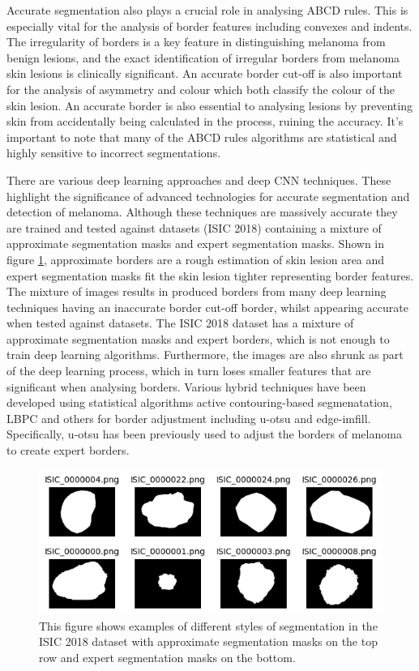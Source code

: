 Accurate segmentation also plays a crucial role in analysing ABCD rules\cite{Lee2020}. This is especially vital for the analysis of border features\cite{Pereira2020, Kaya2016} including convexes and indents. The irregularity of borders is a key feature in distinguishing melanoma from benign lesions, and the exact identification of irregular borders from melanoma skin lesions is clinically significant\cite{patil2021}. An accurate border cut-off is also important for the analysis of asymmetry and colour which both classify the colour of the skin lesion. An accurate border is also essential to analysing lesions by preventing skin from accidentally being calculated in the process, ruining the accuracy. It's important to note that many of the ABCD rules algorithms are statistical and highly sensitive to incorrect segmentations.

There are various deep learning approaches\cite{Albahli2020} and deep CNN techniques\cite{yu2017}. These highlight the significance of advanced technologies for accurate segmentation and detection of melanoma. Although these techniques are massively accurate they are trained and tested against datasets (ISIC 2018) containing a mixture of approximate segmentation masks and expert segmentation masks. Shown in figure \ref{seg-expert}, approximate borders are a rough estimation of skin lesion area and expert segmentation masks fit the skin lesion tighter representing border features. The mixture of images results in produced borders from many deep learning techniques having an inaccurate border cut-off border, whilst appearing accurate when tested against datasets. The ISIC 2018 dataset has a mixture of approximate segmentation masks and expert borders, which is not enough to train deep learning algorithms. Furthermore, the images are also shrunk as part of the deep learning process, which in turn loses smaller features that are significant when analysing borders. Various hybrid techniques have been developed using statistical algorithms active contouring-based segmenatation\cite{Riaz2019}, LBPC and others for border adjustment including u-otsu and edge-imfill. Specifically, u-otsu has been previously used to adjust the borders of melanoma to create expert borders\cite{}.

\begin{figure}[]
    \centering
    \includegraphics[scale=0.9]{images/segmentation/seg-expert-approx.png}
    \caption{This figure shows examples of different styles of segmentation in the ISIC 2018 dataset with approximate segmentation masks on the top row and expert segmentation masks on the bottom.}\label{seg-expert}
\end{figure}


